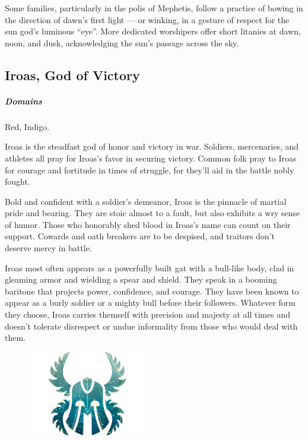         Some families, particularly in the polis of Mephetis, follow a practice of bowing in the direction of dawn's first light --- or winking, in a gesture of respect for the sun god's luminous ``eye''.
        More dedicated worshipers offer short litanies at dawn, noon, and dusk, acknowledging the sun's passage across the sky.
\subsection*{Iroas, God of Victory} \label{ssec::iroas}
    \subparagraph{Domains} Red, Indigo.

    Iroas is the steadfast god of honor and victory in war.
    Soldiers, mercenaries, and athletes all pray for Iroas's favor in securing victory.
    Common folk pray to Iroas for courage and fortitude in times of struggle, for they'll aid in the battle nobly fought.

    Bold and confident with a soldier's demeanor, Iroas is the pinnacle of martial pride and bearing.
    They are stoic almost to a fault, but also exhibits a wry sense of humor.
    Those who honorably shed blood in Iroas's name can count on their support.
    Cowards and oath breakers are to be despised, and traitors don't deserve mercy in battle.

    Iroas most often appears as a powerfully built gat with a bull-like body, clad in gleaming armor and wielding a spear and shield.
    They speak in a booming baritone that projects power, confidence, and courage.
    They have been known to appear as a burly soldier or a mighty bull before their followers.
    Whatever form they choose, Iroas carries themself with precision and majesty at all times and doesn't tolerate disrespect or undue informality from those who would deal with them.

    \begin{figure}[t]
        \centering
        \includegraphics[width=0.47\textwidth]{02viphoger/img/10s_iroas.png}
    \end{figure}

